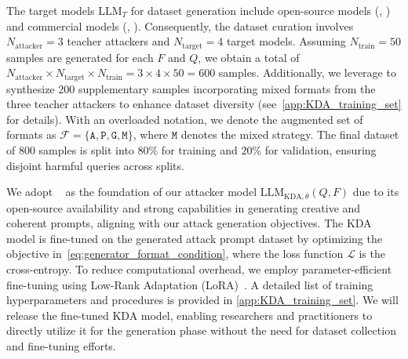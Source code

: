 The target models $\text{LLM}_T$ for dataset generation include open-source models (, ) and commercial models (, ). Consequently, the dataset curation involves $N_{\text{attacker}}=3$ teacher attackers and $N_{\text{target}}=4$ target models. Assuming $N_{\text{train}}=50$ samples are generated for each $F$ and $Q$, we obtain a total of $N_{\text{attacker}}\times N_{\text{target}} \times N_{\text{train}} = 3 \times 4 \times 50 = 600$ samples. Additionally, we leverage  to synthesize 200 supplementary samples incorporating mixed formats from the three teacher attackers to enhance dataset diversity (see~\autoref{app:KDA_training_set} for details). With an overloaded notation, we denote the augmented set of formats as $\mathcal{F}=\{\texttt{A},\texttt{P},\texttt{G},\texttt{M}\}$, where $\texttt{M}$ denotes the mixed strategy. The final dataset of 800 samples is split into $80\%$ for training and $20\%$ for validation, ensuring disjoint harmful queries across splits.

 We adopt ~\citep{zheng_judging_2023} as the foundation of our attacker model $\text{LLM}_{\text{KDA},\theta}(Q, F)$ due to its open-source availability and strong capabilities in generating creative and coherent prompts, aligning with our attack generation objectives. The KDA model is fine-tuned on the generated attack prompt dataset by optimizing the objective in~\autoref{eq:generator_format_condition}, where the loss function $\mathcal{L}$ is the cross-entropy. To reduce computational overhead, we employ parameter-efficient fine-tuning using Low-Rank Adaptation (LoRA)~\citep{hu_lora_2021}. A detailed list of training hyperparameters and procedures is provided in \autoref{app:KDA_training_set}. We will release the fine-tuned KDA model, enabling researchers and practitioners to directly utilize it for the generation phase without the need for dataset collection and fine-tuning efforts.

